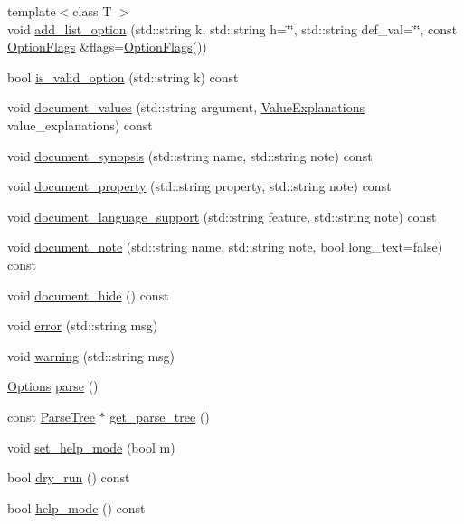\begin{DoxyCompactItemize}
\item 
{\footnotesize template$<$class T $>$ }\\void \hyperlink{classOptionParser_abc092e2c9991177f642239bda77d7129}{add\-\_\-list\-\_\-option} (std\-::string k, std\-::string h=\char`\"{}\char`\"{}, std\-::string def\-\_\-val=\char`\"{}\char`\"{}, const \hyperlink{structOptionFlags}{Option\-Flags} \&flags=\hyperlink{structOptionFlags}{Option\-Flags}())
\item 
bool \hyperlink{classOptionParser_ae52b1b1c3dac41993fbb8918b1f3b7dd}{is\-\_\-valid\-\_\-option} (std\-::string k) const 
\item 
void \hyperlink{classOptionParser_a6f22eedb86fe5c31867167832f1efc2a}{document\-\_\-values} (std\-::string argument, \hyperlink{option__parser__util_8h_a916a9983a28a9efe2c606860052d5fe0}{Value\-Explanations} value\-\_\-explanations) const 
\item 
void \hyperlink{classOptionParser_a3b763d84fba64b00252de7788651757e}{document\-\_\-synopsis} (std\-::string name, std\-::string note) const 
\item 
void \hyperlink{classOptionParser_af468227b103c3b13ee15837d59a812c1}{document\-\_\-property} (std\-::string property, std\-::string note) const 
\item 
void \hyperlink{classOptionParser_a7926a946f395f2fb288636287ffa2275}{document\-\_\-language\-\_\-support} (std\-::string feature, std\-::string note) const 
\item 
void \hyperlink{classOptionParser_a79d2ec3cc57c92e744f637432a800be5}{document\-\_\-note} (std\-::string name, std\-::string note, bool long\-\_\-text=false) const 
\item 
void \hyperlink{classOptionParser_a4539cc4ef19198b8c9987209738d1479}{document\-\_\-hide} () const 
\item 
void \hyperlink{classOptionParser_a015ea07574bd300c07d9b653bdd7a41b}{error} (std\-::string msg)
\item 
void \hyperlink{classOptionParser_a0b6f2e109a6bf61b74aa2e8d0fd48ebf}{warning} (std\-::string msg)
\item 
\hyperlink{classOptions}{Options} \hyperlink{classOptionParser_a5d62806719c9c3e2ef962952977cce7f}{parse} ()
\item 
const \hyperlink{option__parser__util_8h_aec975d670a266efbd55f05ed9f9baf9a}{Parse\-Tree} $\ast$ \hyperlink{classOptionParser_aa30a0a9106c2660088363eba8e875936}{get\-\_\-parse\-\_\-tree} ()
\item 
void \hyperlink{classOptionParser_a280d3a9daf3916579cffb7c759d2ea7f}{set\-\_\-help\-\_\-mode} (bool m)
\item 
bool \hyperlink{classOptionParser_a1587e4915a30a4d2f1d1c936a6f75315}{dry\-\_\-run} () const 
\item 
bool \hyperlink{classOptionParser_afc8ffbbe52b63f06da9c4ea3316ecf6a}{help\-\_\-mode} () const 
\end{DoxyCompactItemize}
